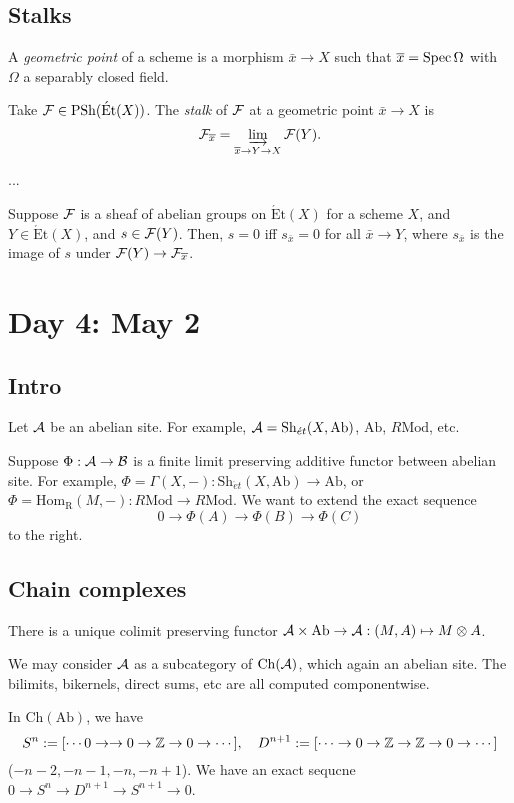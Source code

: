 \documentclass{../../../small}
\newcommand{\Et}{\mathrm{\acute Et}}
\begin{document}
\subsection{Stalks}
\begin{defn*}
A \emph{geometric point} of a scheme is a morphism $\bar x\to X$ such that $\overline x=\operatorname{Spec}\Omega$ with $\Omega$ a separably closed field.
\end{defn*}
\begin{defn*}
Take $\cF\in\mathrm{PSh}(\Et(X))$.
The \emph{stalk} of $\mathcal{F}$ at a geometric point $\bar x\to X$ is 
\[\mathcal{F}_{\overline x}=\varinjlim_{\overline x\to Y\to X}\mathcal{F}(Y).\]
\end{defn*}


...
\begin{prop*}
Suppose $\mathcal{F}$ is a sheaf of abelian groups on $\Et(X)$ for a scheme $X$, and $Y\in\Et(X)$, and $s\in\mathcal{F}(Y)$.
Then, $s=0$ iff $s_{\bar x}=0$ for all $\bar x\to Y$, where $s_{\bar x}$ is the image of $s$ under $\mathcal{F}(Y)\to\mathcal{F}_{\overline x}$.
\end{prop*}

\newpage
\section{Day 4: May 2}

\subsection{Intro}
Let $\mathcal{A}$ be an abelian site.
For example, $\mathcal{A}=\mathrm{Sh}_{\acute et}(X,\mathrm{Ab})$, $\mathrm{Ab}$, $R\mathrm{Mod}$, etc.

Suppose $\Phi:\mathcal{A}\to\mathcal{B}$ is a finite limit preserving additive functor between abelian site.
For example, $\Phi=\Gamma(X,-):\mathrm{Sh}_{\acute et}(X,\mathrm{Ab})\to\mathrm{Ab}$, or $\Phi=\mathrm{Hom_R}(M,-):R\mathrm{Mod}\to R\mathrm{Mod}$.
We want to extend the exact sequence
\[0\to\Phi(A)\to\Phi(B)\to\Phi(C)\]
to the right.


\subsection{Chain complexes}
There is a unique colimit preserving functor $\mathcal{A}\times\mathrm{Ab}\to\mathcal{A}:(M,A)\mapsto M\otimes A$.

We may consider $\mathcal{A}$ as a subcategory of $\mathrm{Ch}(\mathcal{A})$, which again an abelian site.
The bilimits, bikernels, direct sums, etc are all computed componentwise.

In $\mathrm{Ch}(\mathrm{Ab})$, we have
\[S^n:=[\cdots0\to\to0\to\mathbb{Z}\to0\to\cdots],\quad D^{n+1}:=[\cdots\to0\to\mathbb{Z}\to\mathbb{Z}\to0\to\cdots]\]
($-n-2,-n-1,-n,-n+1$).
We have an exact sequcne $0\to S^n\to D^{n+1}\to S^{n+1}\to0$.
\end{document}
